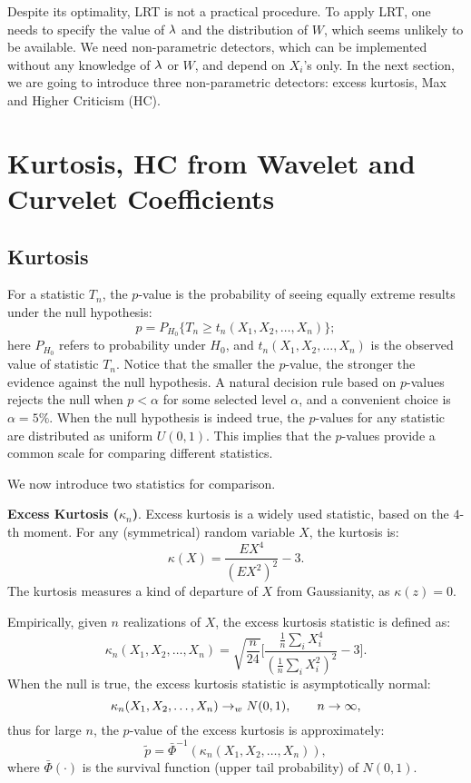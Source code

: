 Despite its optimality, LRT is not a practical procedure. To apply LRT, one needs to specify the value of $\lambda$ and 
the distribution of $W$, which seems unlikely to be available. We need non-parametric detectors, which can be implemented 
without any knowledge of $\lambda$ or $W$, and depend on $X_i$'s only. In the next section, we are going to introduce three 
non-parametric detectors: excess kurtosis, Max and Higher Criticism (HC).   

\section{Kurtosis, HC from Wavelet and Curvelet Coefficients}
 
\subsection{Kurtosis}

For a statistic $T_n$, the $p$-value is the probability of seeing equally extreme results under the null hypothesis:
\[
p = P_{H_0} \{ T_n  \geq t_n(X_1,X_2, \ldots,X_n) \}; 
\] 
here $P_{H_0}$ refers to probability under $H_0$, and $t_n(X_1,X_2, \ldots,X_n)$ is the observed value of statistic $T_n$. 
Notice that the smaller the $p$-value, the stronger the evidence against the null hypothesis. A natural decision rule based 
on $p$-values rejects the null when $p < \alpha$ for some selected level $\alpha$, and a convenient choice is  $\alpha = 5\%$. 
When the null hypothesis is indeed true, the $p$-values for any statistic are distributed as uniform $U(0,1)$. This implies 
that the $p$-values provide a common scale for comparing different statistics. 

We now introduce two statistics for comparison. 

{\bf Excess Kurtosis ($\kappa_n$)}. Excess kurtosis is a widely used statistic, based on the $4$-th moment. 
For any (symmetrical) random variable $X$, the kurtosis is:
\[
\kappa(X) = \frac{EX^4}{(EX^2)^2} -3. 
\]
The kurtosis measures a kind of departure of $X$ from  Gaussianity, as $\kappa(z) =  0$.  

Empirically, given $n$ realizations of $X$, the excess kurtosis statistic is defined as: 
\begin{equation}  \label{EqDefineK}
\kappa_n(X_1, X_2,\ldots,X_n)  = \sqrt{\frac{n}{24}} \biggl[ \frac{\frac{1}{n}\sum_i  X_i^4}{(\frac{1}{n}  \sum_i X_i^2)^2}  - 3  \biggr].
\end{equation} 
When the null is true, the excess kurtosis statistic is asymptotically normal:
\[
\kappa_n(X_1, X_2,\ldots,X_n)  \rightarrow_{w}  N(0,1), \qquad n \rightarrow \infty,
\]
thus for large $n$, the $p$-value of the excess kurtosis is approximately:
\[
\tilde{p} = \bar{\Phi}^{-1} (\kappa_n(X_1, X_2,\ldots,X_n)), 
\]
where $\bar{\Phi}(\cdot)$ is the survival function (upper tail probability) of $N(0,1)$. 

